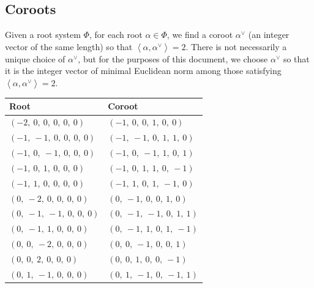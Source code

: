 \documentclass[11pt]{article}
\newcommand{\la}{\left\langle}
\newcommand{\ra}{\right\rangle}
\theoremstyle{definition}
\begin{document}
\subsection{Coroots}

Given a root system $\Phi$, for each root $\alpha \in \Phi$, we find a coroot $\alpha^\vee$ (an integer vector of the same length) so that $\la \alpha, \alpha^\vee \ra = 2$. There is not necessarily a unique choice of $\alpha^\vee$, but for the purposes of this document, we choose $\alpha^\vee$ so that it is the integer vector of minimal Euclidean norm among those satisfying $\la \alpha, \alpha^\vee \ra = 2$.

\bigskip

\noindent \begin{tabular}{|l|l|}
    \hline
    \textbf{Root} & \textbf{Coroot} \\
    \hline
    $\left( -2, \  0, \  0, \  0, \  0, \  0\right)$ & $\left( -1, \  0, \  0, \  1, \  0, \  0\right)$ \\
    \hline
    $\left( -1, \  -1, \  0, \  0, \  0, \  0\right)$ & $\left( -1, \  -1, \  0, \  1, \  1, \  0\right)$ \\
    \hline
    $\left( -1, \  0, \  -1, \  0, \  0, \  0\right)$ & $\left( -1, \  0, \  -1, \  1, \  0, \  1\right)$ \\
    \hline
    $\left( -1, \  0, \  1, \  0, \  0, \  0\right)$ & $\left( -1, \  0, \  1, \  1, \  0, \  -1\right)$ \\
    \hline
    $\left( -1, \  1, \  0, \  0, \  0, \  0\right)$ & $\left( -1, \  1, \  0, \  1, \  -1, \  0\right)$ \\
    \hline
    $\left( 0, \  -2, \  0, \  0, \  0, \  0\right)$ & $\left( 0, \  -1, \  0, \  0, \  1, \  0\right)$ \\
    \hline
    $\left( 0, \  -1, \  -1, \  0, \  0, \  0\right)$ & $\left( 0, \  -1, \  -1, \  0, \  1, \  1\right)$ \\
    \hline
    $\left( 0, \  -1, \  1, \  0, \  0, \  0\right)$ & $\left( 0, \  -1, \  1, \  0, \  1, \  -1\right)$ \\
    \hline
    $\left( 0, \  0, \  -2, \  0, \  0, \  0\right)$ & $\left( 0, \  0, \  -1, \  0, \  0, \  1\right)$ \\
    \hline
    $\left( 0, \  0, \  2, \  0, \  0, \  0\right)$ & $\left( 0, \  0, \  1, \  0, \  0, \  -1\right)$ \\
    \hline
    $\left( 0, \  1, \  -1, \  0, \  0, \  0\right)$ & $\left( 0, \  1, \  -1, \  0, \  -1, \  1\right)$ \\

\end{tabular}
\end{document}
